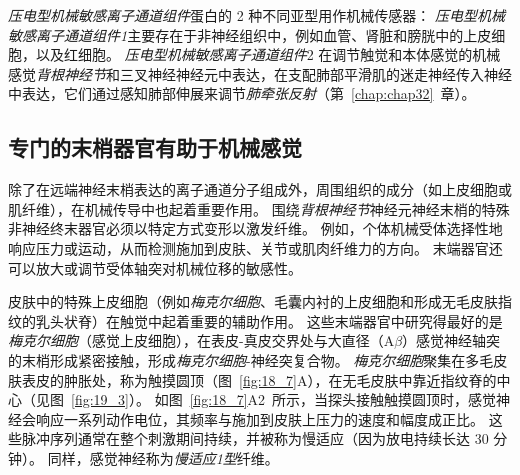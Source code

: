 \textit{压电型机械敏感离子通道组件}蛋白的 2 种不同亚型用作机械传感器：
\textit{压电型机械敏感离子通道组件1}主要存在于非神经组织中，例如血管、肾脏和膀胱中的上皮细胞，以及红细胞。
\textit{压电型机械敏感离子通道组件}2 在调节触觉和本体感觉的机械感觉\textit{背根神经节}和三叉神经神经元中表达，在支配肺部平滑肌的迷走神经传入神经中表达，它们通过感知肺部伸展来调节\textit{肺牵张反射}（第~\ref{chap:chap32}~章）。



\subsection{专门的末梢器官有助于机械感觉}

除了在远端神经末梢表达的离子通道分子组成外，周围组织的成分（如上皮细胞或肌纤维），在机械传导中也起着重要作用。
围绕\textit{背根神经节}神经元神经末梢的特殊非神经终末器官必须以特定方式变形以激发纤维。
例如，个体机械受体选择性地响应压力或运动，从而检测施加到皮肤、关节或肌肉纤维力的方向。
末端器官还可以放大或调节受体轴突对机械位移的敏感性。


皮肤中的特殊上皮细胞（例如\textit{梅克尔细胞}、毛囊内衬的上皮细胞和形成无毛皮肤指纹的乳头状脊）在触觉中起着重要的辅助作用。
这些末端器官中研究得最好的是\textit{梅克尔细胞}（感觉上皮细胞），在表皮-真皮交界处与大直径（A$\beta$）感觉神经轴突的末梢形成紧密接触，形成\textit{梅克尔细胞}-神经突复合物。
\textit{梅克尔细胞}聚集在多毛皮肤表皮的肿胀处，称为触摸圆顶（图~\ref{fig:18_7}A），在无毛皮肤中靠近指纹脊的中心（见图~\ref{fig:19_3}）。
如图~\ref{fig:18_7}A2~所示，当探头接触触摸圆顶时，感觉神经会响应一系列动作电位，其频率与施加到皮肤上压力的速度和幅度成正比。
这些脉冲序列通常在整个刺激期间持续，并被称为慢适应（因为放电持续长达 30 分钟）。
同样，感觉神经称为\textit{慢适应1型}纤维。



